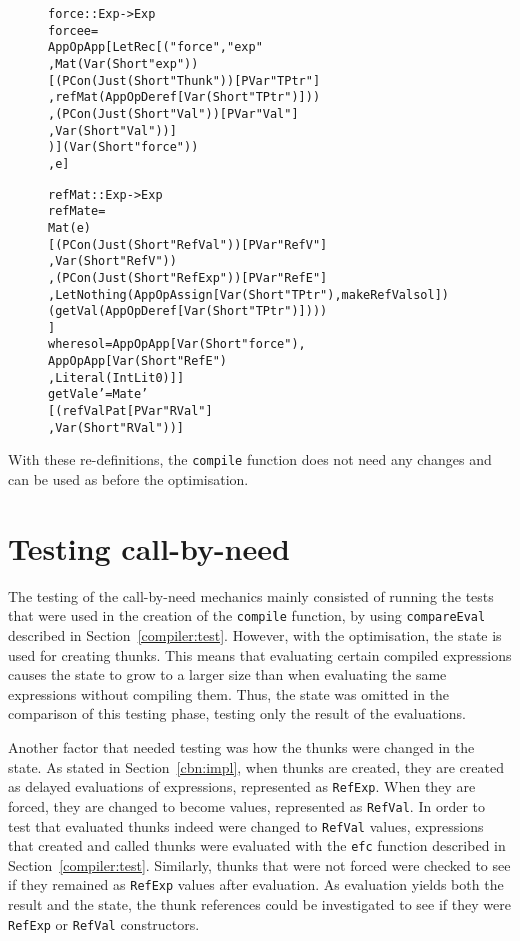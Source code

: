 \begin{figure}[H]
\begin{alltt}
  force :: Exp -> Exp
  force e =
    App OpApp [LetRec [("force", "exp"
                       , Mat (Var (Short "exp"))
                         [(PCon (Just (Short "Thunk")) [PVar "TPtr"]
                          ,refMat (App OpDeref [Var (Short "TPtr")]))
                         ,(PCon (Just (Short "Val")) [PVar "Val"]
                          , Var (Short "Val"))]
                       )] (Var (Short "force"))
              , e]

  refMat :: Exp -> Exp
  refMat e =
    Mat (e)
    [(PCon (Just (Short "RefVal")) [PVar "RefV"]
     ,Var (Short "RefV"))
    ,(PCon (Just (Short "RefExp")) [PVar "RefE"]
     ,Let Nothing (App OpAssign [Var (Short "TPtr"), makeRefVal sol])
       (getVal (App OpDeref [Var (Short "TPtr")])))
    ]
    where sol = App OpApp [Var (Short "force"),
                           App OpApp [Var (Short "RefE")
                                     ,Literal (IntLit 0)]]
          getVal e' = Mat e'
                      [(refValPat [PVar "RVal"]
                       ,Var (Short "RVal"))]
\end{alltt}
\end{figure}
With these re-definitions, the \texttt{compile} function does not need any
changes and can be used as before the optimisation.

\section{Testing call-by-need}
The testing of the call-by-need mechanics mainly consisted of running the tests
that were used in the creation of the \texttt{compile} function, by using
\texttt{compareEval} described in Section~\ref{compiler:test}. However, with
the optimisation, the state is used for creating thunks. This means that
evaluating certain compiled expressions causes the state to grow to a larger
size than when evaluating the same expressions without compiling them. Thus, the
state was omitted in the comparison of this testing phase, testing only the
result of the evaluations.

Another factor that needed testing was how the thunks were changed in the state.
As stated in Section~\ref{cbn:impl}, when thunks are created, they are created
as delayed evaluations of expressions, represented as \texttt{RefExp}. When they
are forced, they are changed to become values, represented as \texttt{RefVal}.
In order to test that evaluated thunks indeed were changed to \texttt{RefVal}
values, expressions that created and called thunks were evaluated with the
\texttt{efc} function described in Section~\ref{compiler:test}. Similarly,
thunks that were not forced were checked to see if they remained as
\texttt{RefExp} values after evaluation. As evaluation yields both the result
and the state, the thunk references could be investigated to see if they were
\texttt{RefExp} or \texttt{RefVal} constructors.

